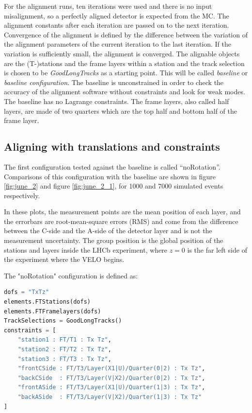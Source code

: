 For the alignment runs, ten iterations were used and there is no input misalignment, so a perfectly aligned detector is expected from the MC.
The alignment constants after each iteration are passed on to the next iteration.
Convergence of the alignment is defined by the difference between the variation of the alignment parameters of the current iteration to the last iteration. If the variation is sufficiently small, the alignment is converged.
The alignable objects are the (T-)stations and the frame layers within a station and the track selection is chosen to be \textit{GoodLongTracks} as a starting point. This will be called \textit{baseline} or \textit{baseline configuration}.
The baseline is unconstrained in order to check the accuracy of the alignment software without constraints and look for weak modes.
The baseline has no Lagrange constraints.
The frame layers, also called half layers, are made of two quarters which are the top half and bottom half of the frame layer.

\subsection{Aligning with translations and constraints}
The first configuration tested against the baseline is called “noRotation”. Comparisons of this configuration with the baseline are shown in figure \ref{fig:june_2} and figure \ref{fig:june_2_1}, for 1000 and 7000 simulated events respectively.

In these plots, the measurement points are the mean position of each layer, and the errorbars are root-mean-square errors (RMS) and come from the difference between the C-side and the A-side of the detector layer and is not the measurement uncertainty.
The group position is the global position of the stations and layers inside the LHCb experiment, where $z = 0$ is the far left side of the experiment where the VELO begins.

The "noRotation" configuration is defined as:

\begin{lstlisting}[language=Python, basicstyle=\footnotesize]
dofs = "TxTz"
elements.FTStations(dofs)
elements.FTFramelayers(dofs)
TrackSelections = GoodLongTracks()
constraints = [
    "station1 : FT/T1 : Tx Tz",
    "station2 : FT/T2 : Tx Tz",
    "station3 : FT/T3 : Tx Tz",
    "frontCSide : FT/T3/Layer(X1|U)/Quarter(0|2) : Tx Tz",
    "backCSide  : FT/T3/Layer(V|X2)/Quarter(0|2) : Tx Tz",
    "frontASide : FT/T3/Layer(X1|U)/Quarter(1|3) : Tx Tz",
    "backASide  : FT/T3/Layer(V|X2)/Quarter(1|3) : Tx Tz"
]
\end{lstlisting}

